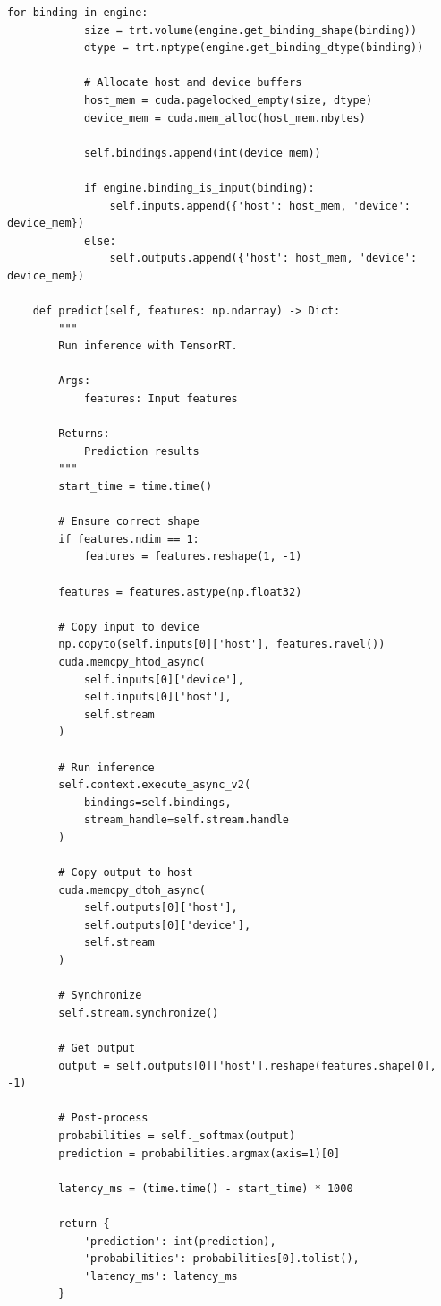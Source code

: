 \begin{lstlisting}[style=python, caption=TensorRT optimization for NVIDIA GPUs]
        for binding in engine:
            size = trt.volume(engine.get_binding_shape(binding))
            dtype = trt.nptype(engine.get_binding_dtype(binding))

            # Allocate host and device buffers
            host_mem = cuda.pagelocked_empty(size, dtype)
            device_mem = cuda.mem_alloc(host_mem.nbytes)

            self.bindings.append(int(device_mem))

            if engine.binding_is_input(binding):
                self.inputs.append({'host': host_mem, 'device': device_mem})
            else:
                self.outputs.append({'host': host_mem, 'device': device_mem})

    def predict(self, features: np.ndarray) -> Dict:
        """
        Run inference with TensorRT.

        Args:
            features: Input features

        Returns:
            Prediction results
        """
        start_time = time.time()

        # Ensure correct shape
        if features.ndim == 1:
            features = features.reshape(1, -1)

        features = features.astype(np.float32)

        # Copy input to device
        np.copyto(self.inputs[0]['host'], features.ravel())
        cuda.memcpy_htod_async(
            self.inputs[0]['device'],
            self.inputs[0]['host'],
            self.stream
        )

        # Run inference
        self.context.execute_async_v2(
            bindings=self.bindings,
            stream_handle=self.stream.handle
        )

        # Copy output to host
        cuda.memcpy_dtoh_async(
            self.outputs[0]['host'],
            self.outputs[0]['device'],
            self.stream
        )

        # Synchronize
        self.stream.synchronize()

        # Get output
        output = self.outputs[0]['host'].reshape(features.shape[0], -1)

        # Post-process
        probabilities = self._softmax(output)
        prediction = probabilities.argmax(axis=1)[0]

        latency_ms = (time.time() - start_time) * 1000

        return {
            'prediction': int(prediction),
            'probabilities': probabilities[0].tolist(),
            'latency_ms': latency_ms
        }


\end{lstlisting}
